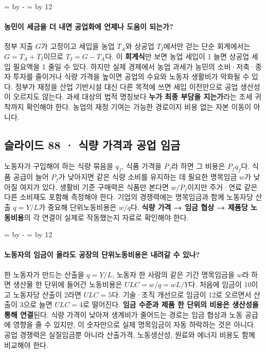 \documentclass[10pt,a4paper]{article}
\newcommand{\ReserveQuestionSpace}{%
  \par\begingroup
  \dimen0=\pagegoal \advance\dimen0 by -\pagetotal
  \dimen2=\baselineskip \multiply\dimen2 by 12
  \ifdim\dimen0<\dimen2 \newpage\fi
  \endgroup}
\begin{document}
\ReserveQuestionSpace
\paragraph{농민이 세금을 더 내면 공업화에 언제나 도움이 되는가?}
정부 지출 $G$가 고정이고 세입을 농업 $T_A$와 상공업 $T_I$에서만 걷는 단순 회계에서는 $G=T_A+T_I$이므로 $T_I=G-T_A$다. 이 \textbf{회계식}만 보면 농업 세입이 1 늘면 상공업 세입 필요액을 1 줄일 수 있다. 하지만 실제 경제에서 농업 과세가 농민의 소비·저축·종자 투자를 줄이거나 식량 가격을 높이면 공업의 수요와 노동자 생활비가 악화될 수 있다. 정부가 재정을 산업 기반시설 대신 다른 목적에 쓰면 세입 이전만으로 공업 생산성이 오르지도 않는다. 과세 대상의 법적 명칭보다 \textbf{누가 최종 부담을 지는가}라는 조세 귀착까지 확인해야 한다. 농업의 재정 기여는 가능한 경로이지 비용 없는 자본 이동이 아니다.\par

\subsection{슬라이드 88 · 식량 가격과 공업 임금}
노동자가 구입해야 하는 식량 묶음을 $q_f$, 식품 가격을 $P_f$라 하면 그 비용은 $P_fq_f$다. 식품 공급이 늘어 $P_f$가 낮아지면 같은 식량 소비를 유지하는 데 필요한 명목임금 $w$가 낮아질 여지가 있다. 생활비 기준 구매력은 식품만 본다면 $w/P_f$이지만 주거·연료 같은 다른 소비재도 포함해 측정해야 한다. 기업의 경쟁력에는 명목임금과 함께 노동자당 산출 $q=Y/L$가 중요해 단위노동비용은 $w/q$다. \textbf{식량 가격 → 임금 협상 → 제품당 노동비용}의 각 연결이 실제로 작동했는지 자료로 확인해야 한다.\par

\ReserveQuestionSpace
\paragraph{노동자의 임금이 올라도 공장의 단위노동비용은 내려갈 수 있나?}

한 노동자가 만드는 산출을 $q=Y/L$, 노동자 한 사람의 같은 기간 명목임금을 $w$라 하면 생산물 한 단위에 들어간 노동비용은 $ULC=w/q=wL/Y$다. 처음에 임금이 10이고 노동자당 산출이 2라면 $ULC=5$다. 기술·조직 개선으로 임금이 12로 오르면서 산출이 3으로 늘면 $ULC=4$로 떨어진다. \textbf{임금 수준과 제품 한 단위의 비용은 생산성을 통해 연결}된다. 식량 가격이 낮아져 생계비가 줄어드는 경로는 임금 협상과 노동 공급에 영향을 줄 수 있지만, 이 숫자만으로 실제 명목임금이 자동 하락하는 것은 아니다. 공업 경쟁력은 실질임금뿐 아니라 산출가격, 노동생산성, 원료와 에너지 비용도 함께 비교해야 한다.\par
\end{document}
